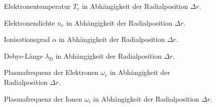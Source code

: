 \begin{figure}[htbp]
    \centering
    
    \caption{
        Elektronentemperatur $T_e$ in Abh\"angigkeit der Radialposition $\Delta r$.
    }
    \label{radial_Te}
\end{figure}
\begin{figure}[htbp]
    \centering
    
    \caption{
        Elektronendichte $n_e$ in Abh\"angigkeit der Radialposition $\Delta r$.
    }
    \label{radial_ne}
\end{figure}
\begin{figure}[htbp]
    \centering
    
    \caption{
        Ionisationsgrad $\alpha$ in Abh\"angigkeit der Radialposition $\Delta r$.
    }
    \label{radial_alpha}
\end{figure}
\begin{figure}[htbp]
    \centering
    
    \caption{
        Debye-L\"ange $\lambda_\text{D}$ in Abh\"angigkeit der Radialposition $\Delta r$.
    }
    \label{radial_deb}
\end{figure}
\begin{figure}[htbp]
    \centering
    
    \caption{
        Plasmafrequenz der Elektronen $\omega_e$ in Abh\"angigkeit der Radialposition $\Delta r$.
    }
    \label{radial_wpe}
\end{figure}
\begin{figure}[htbp]
    \centering
    
    \caption{
        Plasmafrequenz der Ionen $\omega_i$ in Abh\"angigkeit der Radialposition $\Delta r$.
    }
    \label{radial_wpi}
\end{figure}